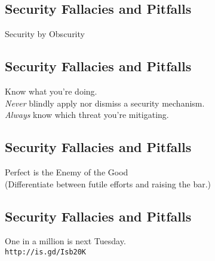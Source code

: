\documentclass[xga]{xdvislides}
\begin{document}
\subsection{Security Fallacies and Pitfalls}
\vspace*{\fill}
\begin{center}
	\Hugesize
        Security by Obscurity \\
\end{center}
\vspace*{\fill}

\subsection{Security Fallacies and Pitfalls}
\vspace*{\fill}
\begin{center}
	\Hugesize
	Know what you're doing. \\
\addvspace{.25in}
	\Normalsize
	{\em Never} blindly apply nor dismiss a security mechanism. \\
\addvspace{.125in}
	{\em Always} know which threat you're mitigating.
\end{center}
\vspace*{\fill}

\subsection{Security Fallacies and Pitfalls}
\vspace*{\fill}
\begin{center}
    \Hugesize
        Perfect is the Enemy of the Good \\
	\vspace{.25in}
	\Normalsize
	(Differentiate between futile efforts and raising the bar.)
\end{center}
\vspace*{\fill}

\subsection{Security Fallacies and Pitfalls}
\vspace*{\fill}
\begin{center}
    \Hugesize
        One in a million is next Tuesday. \\
	\vspace{.25in}
	\Normalsize
	\verb+http://is.gd/Isb20K+
\end{center}
\vspace*{\fill}
\end{document}
